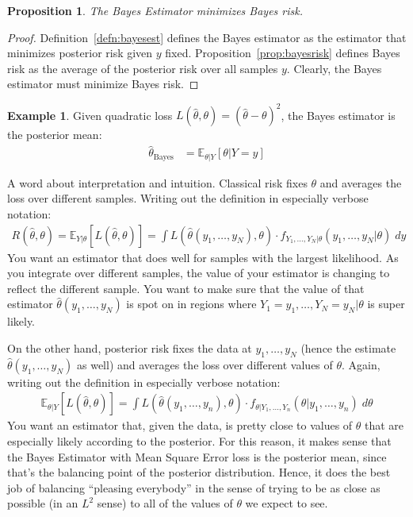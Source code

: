 \documentclass[12pt]{article}
\theoremstyle{plain}
\newtheorem{prop}[thm]{Proposition}
\theoremstyle{definition}
\newtheorem{ex}[thm]{Example}
\theoremstyle{remark}
\newcommand{\E}{\mathbb{E}}
\begin{document}
\begin{prop}
The Bayes Estimator minimizes Bayes risk.
\end{prop}
\begin{proof}
Definition~\ref{defn:bayesest} defines the Bayes estimator as the
estimator that minimizes posterior risk given $y$ fixed.
Proposition~\ref{prop:bayesrisk} defines Bayes risk as the average of
the posterior risk over all samples $y$. Clearly, the Bayes estimator must
minimize Bayes risk.
\end{proof}


\begin{ex}
Given quadratic loss $L(\hat{\theta},\theta) = (\hat{\theta}-\theta)^2$,
the Bayes estimator is the posterior mean:
\begin{align*}
  \hat{\theta}_{\text{Bayes}}
  &= \E_{\theta|Y}[\theta|Y=y]
\end{align*}
\end{ex}

A word about interpretation and intuition. Classical risk fixes $\theta$
and averages the loss over different samples. Writing out the definition
in especially verbose notation:
\begin{align*}
  R(\hat{\theta},\theta)=
  \E_{Y|\theta}[L(\hat{\theta},\theta)] =
  \int L(\hat{\theta}(y_1,\ldots,y_N),\theta)
    \cdot f_{Y_1,\ldots,Y_N|\theta}(y_1,\ldots,y_N|\theta)\; dy
\end{align*}
You want an estimator that does well for samples with the largest
likelihood. As you integrate over different samples, the value of your
estimator is changing to reflect the different sample. You want to make
sure that the value of that estimator $\hat{\theta}(y_1,\ldots,y_N)$ is
spot on in regions where $Y_1=y_1,\ldots,Y_N=y_N|\theta$ is super
likely.

On the other hand, posterior risk fixes the data at $y_1,\ldots,y_N$
(hence the estimate $\hat{\theta}(y_1,\ldots,y_N)$ as well) and averages
the loss over different values of $\theta$.
Again, writing out the definition in especially verbose notation:
\begin{align*}
  \E_{\theta|Y}[L(\hat{\theta},\theta)] =
  \int L(\hat{\theta}(y_1,\ldots,y_n),\theta)
    \cdot f_{\theta|Y_1,\ldots,Y_n}(\theta|y_1,\ldots,y_n)\; d\theta
\end{align*}
You want an estimator that, given the data, is pretty close to values of
$\theta$ that are especially likely according to the posterior.  For
this reason, it makes sense that the Bayes Estimator with Mean Square
Error loss is the posterior mean, since that's the balancing point of
the posterior distribution. Hence, it does the best job of balancing
``pleasing everybody'' in the sense of trying to be as close as possible
(in an $L^2$ sense) to all of the values of $\theta$ we expect to see.
\end{document}
